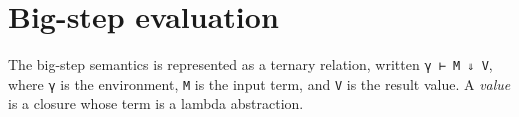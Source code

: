 \begin{fence}
\begin{code}%
\>[0]\AgdaSpace{}%
\AgdaSymbol{:}\AgdaSpace{}%
\AgdaSpace{}%
\<%
\\
\>[0]\AgdaSpace{}%
\AgdaSymbol{()}\<%
\\
%
\\[\AgdaEmptyExtraSkip]%
\>[0]\AgdaSpace{}%
\AgdaSymbol{:}\AgdaSpace{}%
\AgdaSpace{}%
\AgdaSymbol{\{}\AgdaSymbol{\}}\AgdaSpace{}%
\AgdaSpace{}%
\AgdaSpace{}%
\AgdaSpace{}%
\AgdaSpace{}%
\AgdaSpace{}%
\AgdaSpace{}%
\AgdaSpace{}%
\AgdaSymbol{(}\AgdaSpace{}%
\AgdaOperator{\AgdaInductiveConstructor{,}}\AgdaSpace{}%
\AgdaSymbol{)}\<%
\\
\>[0]\AgdaSymbol{(}\AgdaSpace{}%
\AgdaSpace{}%
\AgdaSymbol{)}\AgdaSpace{}%
\AgdaSpace{}%
\AgdaSymbol{=}\AgdaSpace{}%
\<%
\\
\>[0]\AgdaSymbol{(}\AgdaSpace{}%
\AgdaSpace{}%
\AgdaSymbol{)}\AgdaSpace{}%
\AgdaSymbol{(}\AgdaSpace{}%
\AgdaSymbol{)}\AgdaSpace{}%
\AgdaSymbol{=}\AgdaSpace{}%
\AgdaSpace{}%
\<%
\end{code}
\end{fence}

\hypertarget{big-step-evaluation}{%
\section{Big-step evaluation}\label{big-step-evaluation}}

The big-step semantics is represented as a ternary relation, written
\texttt{γ\ ⊢\ M\ ⇓\ V}, where \texttt{γ} is the environment, \texttt{M}
is the input term, and \texttt{V} is the result value. A \emph{value} is
a closure whose term is a lambda abstraction.

